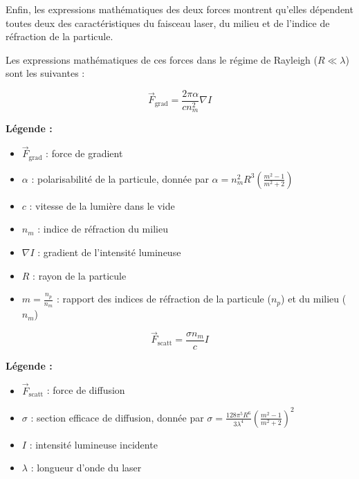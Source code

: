 Enfin, les expressions mathématiques des deux forces montrent qu'elles dépendent toutes deux des caractéristiques du faisceau laser, du milieu et de l'indice de réfraction de la particule.

Les expressions mathématiques de ces forces dans le régime de Rayleigh (\( R \ll \lambda \)) sont les suivantes :


\begin{equation}
    \vec{F}_{\text{grad}} = \frac{2\pi \alpha}{c n_m^2} \nabla I
\end{equation}

\textbf{Légende :}
\begin{itemize}[label=\textbullet]
    \item \( \vec{F}_{\text{grad}} \) : force de gradient
    \item \( \alpha \) : polarisabilité de la particule, donnée par \( \alpha = n_m^2 R^3 \left(\frac{m^2 - 1}{m^2 + 2}\right) \)
    \item \( c \) : vitesse de la lumière dans le vide
    \item \( n_m \) : indice de réfraction du milieu
    \item \( \nabla I \) : gradient de l'intensité lumineuse
    \item \( R \) : rayon de la particule
    \item \( m = \frac{n_p}{n_m} \) : rapport des indices de réfraction de la particule (\( n_p \)) et du milieu (\( n_m \))
\end{itemize}

\begin{equation}
    \vec{F}_{\text{scatt}} = \frac{\sigma n_m}{c} I
\end{equation}

\textbf{Légende :}
\begin{itemize}[label=\textbullet]
    \item \( \vec{F}_{\text{scatt}} \) : force de diffusion
    \item \( \sigma \) : section efficace de diffusion, donnée par \( \sigma = \frac{128\pi^5 R^6}{3 \lambda^4} \left( \frac{m^2 - 1}{m^2 + 2} \right)^2 \)
    \item \( I \) : intensité lumineuse incidente
    \item \( \lambda \) : longueur d'onde du laser
\end{itemize}


